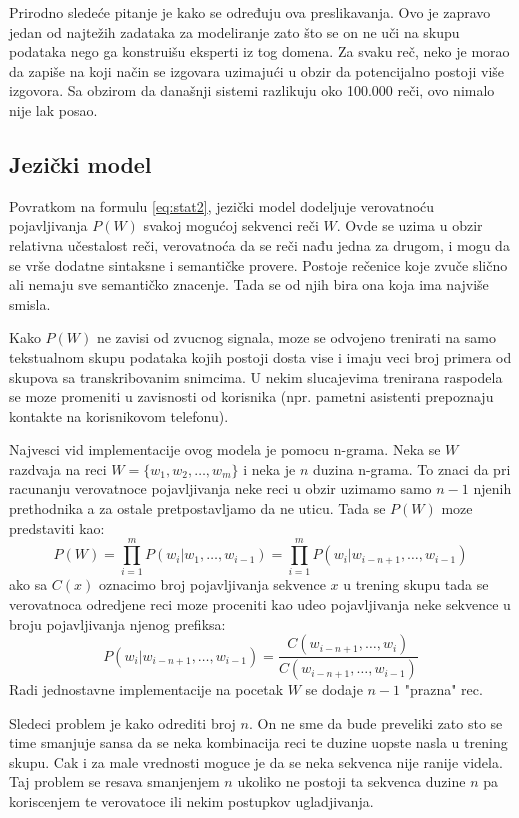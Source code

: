 \documentclass[a4paper]{article}
\begin{document}
Prirodno sledeće pitanje je kako se određuju ova preslikavanja. 
Ovo je zapravo jedan od najtežih zadataka za modeliranje zato što se on ne uči na skupu podataka nego ga konstruišu eksperti iz tog domena.
Za svaku reč, neko je morao da zapiše na koji način se izgovara uzimajući u obzir da potencijalno postoji više izgovora.
Sa obzirom da današnji sistemi razlikuju oko 100.000 reči, ovo nimalo nije lak posao.

\subsection{Jezički model}
Povratkom na formulu \ref{eq:stat2}, jezički model dodeljuje verovatnoću pojavljivanja $P(W)$ svakoj mogućoj sekvenci reči $W$.
Ovde se uzima u obzir relativna učestalost reči, verovatnoća da se reči nađu jedna za drugom, i mogu da se vrše dodatne sintaksne i semantičke provere.
Postoje rečenice koje zvuče slično ali nemaju sve semantičko znacenje.
Tada se od njih bira ona koja ima najviše smisla.

Kako $P(W)$ ne zavisi od zvucnog signala, moze se odvojeno trenirati na samo tekstualnom skupu podataka kojih postoji dosta vise i imaju veci broj primera od skupova sa transkribovanim snimcima.
U nekim slucajevima trenirana raspodela se moze promeniti u zavisnosti od korisnika (npr. pametni asistenti prepoznaju kontakte na korisnikovom telefonu).

Najvesci vid implementacije ovog modela je pomocu n-grama.
Neka se $W$ razdvaja na reci $W = \{w_1, w_2, \dots, w_m\}$ i neka je $n$ duzina n-grama.
To znaci da pri racunanju verovatnoce pojavljivanja neke reci u obzir uzimamo samo $n-1$ njenih prethodnika a za ostale pretpostavljamo da ne uticu.
Tada se $P(W)$ moze predstaviti kao:
\begin{equation*}
  P(W) = \prod_{i=1}^{m} P(w_i | w_1,\dots,w_{i-1}) = \prod_{i=1}^{m} P(w_i | w_{i-n+1},\dots,w_{i-1})
\end{equation*}
ako sa $C(x)$ oznacimo broj pojavljivanja sekvence $x$ u trening skupu tada se verovatnoca odredjene reci moze proceniti kao udeo pojavljivanja neke sekvence u broju pojavljivanja njenog prefiksa:
\begin{equation*}
  P(w_i | w_{i-n+1},\dots,w_{i-1}) = \frac{C(w_{i-n+1},\dots,w_i)}{C(w_{i-n+1},\dots,w_{i-1})}
\end{equation*}
Radi jednostavne implementacije na pocetak $W$ se dodaje $n-1$ "prazna" rec.

Sledeci problem je kako odrediti broj $n$.
On ne sme da bude preveliki zato sto se time smanjuje sansa da se neka kombinacija reci te duzine uopste nasla u trening skupu.
Cak i za male vrednosti moguce je da se neka sekvenca nije ranije videla. 
Taj problem se resava smanjenjem $n$ ukoliko ne postoji ta sekvenca duzine $n$ pa koriscenjem te verovatoce ili nekim postupkov ugladjivanja.
\end{document}
